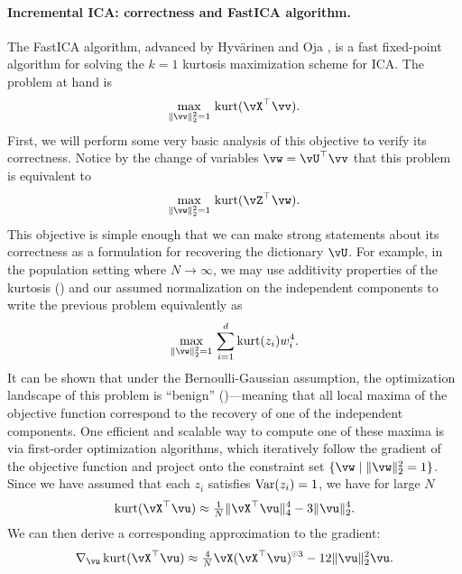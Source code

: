 \documentclass[../../book-main.tex]{subfiles}
\begin{document}
\paragraph{Incremental ICA: correctness and FastICA algorithm.}
The FastICA algorithm, advanced by Hyv\"{a}rinen and Oja \cite{hyvarinen-1997}, is a fast fixed-point algorithm for solving the $k=1$ kurtosis maximization scheme for ICA.
The problem at hand is
\begin{equation}\label{eq:kurtosis-maximization-sphere-finitesample}
    \max_{\norm{\vv}_2^2 = 1}\, \kurt(\vX^\top \vv).
\end{equation}
First, we will perform some very basic analysis of this objective to verify its correctness. Notice by the change of variables $\vw = \vU^\top \vv$ that this problem is equivalent to
\begin{equation*}
    \max_{\norm{\vw}_2^2 = 1}\, 
    \mathrm{kurt}(\vZ^\top \vw).
\end{equation*}
This objective is simple enough that we can make strong statements about its correctness as a formulation for recovering the dictionary $\vU$.
For example, in the population setting where $N \to \infty$, 
we may use additivity properties of the kurtosis () and our assumed normalization on the independent components to write the previous problem equivalently as
\begin{equation}\label{eq:kurtosis-maximization-sphere-population-simple}
    \max_{\norm{\vw}_2^2 = 1}\, 
    \sum_{i=1}^d \mathrm{kurt}(z_i) w_i^4.
\end{equation}
It can be shown that under the Bernoulli-Gaussian assumption, the optimization landscape of this problem is ``benign'' ()---meaning that all local maxima of the objective function correspond to the recovery of one of the independent components.
One efficient and scalable way to compute one of these maxima is via first-order optimization algorithms, which iteratively follow the gradient of the objective function and project onto the constraint set $\set{\vw \given \norm{\vw}_2^2 = 1}$.
Since we have assumed that each $z_i$ satisfies $\operatorname{Var}(z_i)=1$, we 
have for large $N$
\begin{equation}\label{eq:kurtosis-approximation-l4}
    \kurt(\vX^\top \vu)
    \approx
    \tfrac{1}{N} \norm{\vX^\top \vu}_4^4 - 3 \norm{\vu}_2^4.
\end{equation}
We can then derive a corresponding approximation to the gradient:
\begin{equation*}
    \nabla_{\vu} \kurt(\vX^\top \vu)
    \approx
    \tfrac{4}{N} \vX (\vX^\top \vu)^{\hada 3}
    - 12 \norm{\vu}_2^2 \vu.
\end{equation*}
\end{document}
